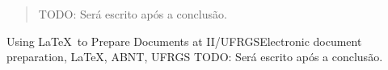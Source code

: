 \begin{abstract}
TODO: Será escrito após a conclusão.
\end{abstract}

\begin{englishabstract}{Using \LaTeX\ to Prepare Documents at II/UFRGS}{Electronic document preparation, \LaTeX, ABNT, UFRGS}
TODO: Será escrito após a conclusão.
\end{englishabstract}